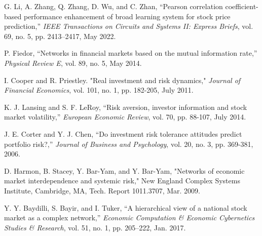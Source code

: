 \documentclass[letterpaper, 10 pt, proceedings]{ieeetran}
\begin{document}
\begin{thebibliography}{99}
		G. Li, A. Zhang, Q. Zhang, D. Wu, and C. Zhan, “Pearson correlation coefficient-based performance enhancement of broad learning system for stock price prediction,” \textit{IEEE Transactions on Circuits and Systems II: Express Briefs}, vol. 69, no. 5, pp. 2413–2417, May 2022. %
		
		P. Fiedor, “Networks in financial markets based on the mutual information rate,” \textit{Physical Review E}, vol. 89, no. 5, May 2014. %
		
		I. Cooper and R. Priestley. "Real investment and risk dynamics," \textit{Journal of Financial Economics}, vol. 101, no. 1, pp. 182-205, July 2011.
		
		K. J. Lansing and S. F. LeRoy, “Risk aversion, investor information and stock market volatility,” \textit{European Economic Review}, vol. 70, pp. 88-107, July 2014. 
		
		J. E. Corter and Y. J. Chen, “Do investment risk tolerance attitudes predict portfolio risk?,” \textit{Journal of Business and Psychology}, vol. 20, no. 3, pp. 369-381, 2006.
		
		D. Harmon, B. Stacey, Y. Bar-Yam, and Y. Bar-Yam, "Networks of economic market interdependence and systemic risk," New England Complex Systems Institute, Cambridge, MA, Tech. Report 1011.3707, Mar. 2009.
		
		Y. Y. Baydilli, S. Bayir, and I. Tuker, “A hierarchical view of a national stock market as a complex network,” \textit{Economic Computation \& Economic Cybernetics Studies \& Research}, vol. 51, no. 1, pp. 205–222, Jan. 2017.
		
	\end{thebibliography}

		

\end{document}

